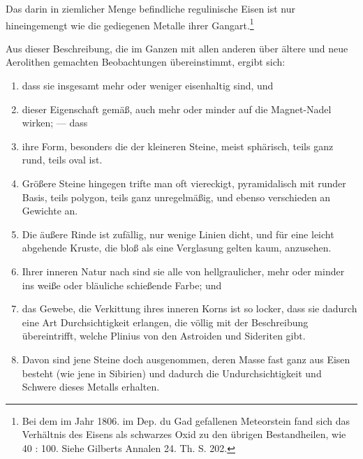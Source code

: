 \documentclass[a4paper, 11pt, oneside, polutonikogreek, german]{article}
\begin{document}
Das darin in ziemlicher Menge befindliche regulinische Eisen ist nur hineingemengt wie die gediegenen Metalle ihrer Gangart.\footnote{Bei dem im Jahr 1806. im Dep. du Gad gefallenen Meteorstein fand sich das Verhältnis des Eisens als schwarzes Oxid zu den übrigen Bestandheilen, wie 40 : 100. Siehe Gilberts Annalen 24. Th. S. 202.}

Aus dieser Beschreibung, die im Ganzen mit allen anderen über ältere und neue Aerolithen gemachten Beobachtungen übereinstimmt, ergibt sich:
\begin{enumerate}
    \item dass sie insgesamt mehr oder weniger eisenhaltig sind, und
    \item dieser Eigenschaft gemäß, auch mehr oder minder auf die Magnet-Nadel wirken; --- dass
    \item ihre Form, besonders die der kleineren Steine, meist sphärisch, teils ganz rund, teils oval ist.
    \item Größere Steine hingegen trifte man oft viereckigt, pyramidalisch mit runder Basis, teils polygon, teils ganz unregelmäßig, und ebenso verschieden an Gewichte an.
    \item Die äußere Rinde ist zufällig, nur wenige Linien dicht, und für eine leicht abgehende Kruste, die bloß als eine Verglasung gelten kaum, anzusehen.
    \item Ihrer inneren Natur nach sind sie alle von hellgraulicher, mehr oder minder ins weiße oder bläuliche schießende Farbe; und
    \item das Gewebe, die Verkittung ihres inneren Korns ist so locker, dass sie dadurch eine Art Durchsichtigkeit erlangen, die völlig mit der Beschreibung übereintrifft, welche Plinius von den Astroiden und Sideriten gibt.
    \item Davon sind jene Steine doch ausgenommen, deren Masse fast ganz aus Eisen besteht (wie jene in Sibirien) und dadurch die Undurchsichtigkeit und Schwere dieses Metalls erhalten.
\end{enumerate}
\end{document}
